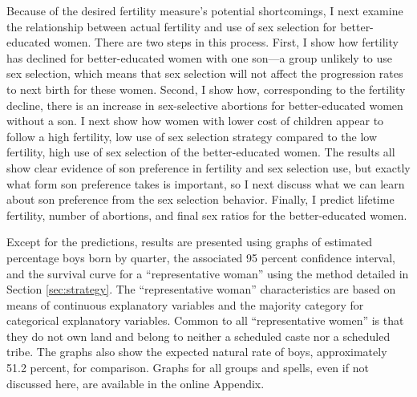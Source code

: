\documentclass[12pt,letterpaper]{article}
\begin{document}
Because of the desired fertility measure's potential shortcomings, I next examine the 
relationship between actual fertility and use of sex selection for better-educated women.
There are two steps in this process.
First, I show how fertility has declined for better-educated women with one son---a group 
unlikely to use sex selection, which means that sex selection will not affect the 
progression rates to next birth for these women.
Second, I show how, corresponding to the fertility decline, there is an increase in
sex-selective abortions for better-educated women without a son.
I next show how women with lower cost of children appear to follow a high fertility, low
use of sex selection strategy compared to the low fertility, high use of sex selection of
the better-educated women.
The results all show clear evidence of son preference in fertility and sex selection use, 
but exactly what form son preference takes is important, so I next discuss what we can
learn about son preference from the sex selection behavior.
Finally, I predict lifetime fertility, number of abortions, and final sex ratios for
the better-educated women.

Except for the predictions, results are presented using graphs of estimated percentage boys 
born by quarter, the associated 95 percent confidence interval, and the survival curve for 
a ``representative woman'' using the method detailed in Section \ref{sec:strategy}.
The ``representative woman'' characteristics are based on means of continuous 
explanatory variables and the majority category for categorical explanatory variables.
Common to all ``representative women'' is that they do not own land and belong to neither 
a scheduled caste nor a scheduled tribe.
The graphs also show the expected natural rate of boys, approximately 51.2 percent, for
comparison.
Graphs for all groups and spells, even if not discussed here, are available in 
the online Appendix.

\end{document}
